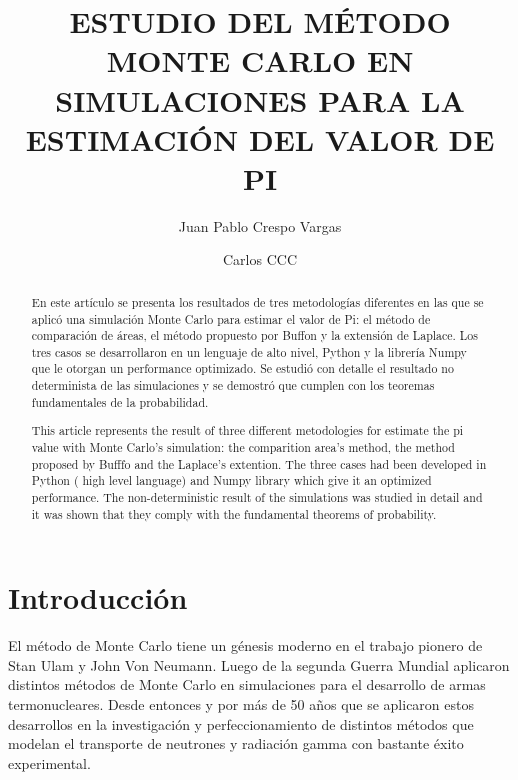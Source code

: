 \documentclass{rbf}
\begin{document}
\title{ESTUDIO DEL MÉTODO MONTE CARLO EN SIMULACIONES PARA LA ESTIMACIÓN DEL VALOR DE PI}

\author{Juan Pablo Crespo Vargas\marca{*}}
%


\author{Carlos CCC \marca{**}}
%


\begin{abstract}
\Resumen
En este artículo se presenta los resultados de tres metodologías diferentes en las que se aplicó una simulación Monte Carlo para estimar el valor de Pi: el método de comparación de áreas, el método propuesto por Buffon y la extensión de Laplace. Los tres casos se desarrollaron en un lenguaje de alto nivel, Python y la librería Numpy que le otorgan un performance optimizado. Se estudió con detalle el resultado no determinista de las simulaciones y se demostró que cumplen con los teoremas fundamentales de la probabilidad.



\Abstract
This article represents the result of three different metodologies for estimate the pi value with Monte Carlo's simulation: the comparition area's method, the method proposed by Bufffo and the Laplace's extention. The three cases had been developed in  Python ( high level language) and Numpy library which give it an optimized performance. The non-deterministic result of the simulations was studied in detail and it was shown that they comply with the fundamental theorems of probability.

\end{abstract}

\maketitle


\section{Introducción}
El método de Monte Carlo tiene un génesis moderno en el trabajo pionero de Stan Ulam y John Von Neumann. Luego de la segunda Guerra Mundial aplicaron distintos métodos de Monte Carlo en simulaciones para el desarrollo de armas termonucleares. Desde entonces y por más de 50 años que se aplicaron estos desarrollos en la investigación y perfeccionamiento de distintos métodos que modelan el transporte de neutrones y radiación gamma con bastante éxito experimental\cite{Kling}. 
\end{document}
